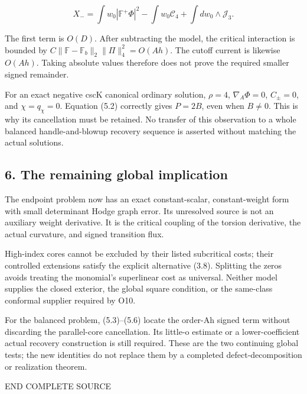 \documentclass[
  10pt,
]{article}
\begin{document}
\[
 X_-=\int w_0|\mathbb F^+\Phi|^2-
           \int w_0\mathcal C_4+\int dw_0\wedge\mathcal J_3.
 \tag{5.6}
\]

The first term is \(O(D)\). After subtracting the model, the critical
interaction is bounded by
\(C\|\mathbb F-\mathbb F_b\|_2\|\Pi\|_4^2=O(Ah)\). The cutoff current is
likewise \(O(Ah)\). Taking absolute values therefore does not prove the
required smaller signed remainder.

For an exact negative cscK canonical ordinary solution, \(\rho=4\),
\(\nabla_A\Phi=0\), \(C_\pm=0\), and \(\chi=q_\chi=0\). Equation (5.2)
correctly gives \(P=2B\), even when \(B\ne0\). This is why its
cancellation must be retained. No transfer of this observation to a
whole balanced handle-and-blowup recovery sequence is asserted without
matching the actual solutions.

\hypertarget{the-remaining-global-implication}{%
\subsection{6. The remaining global
implication}\label{the-remaining-global-implication}}

The endpoint problem now has an exact constant-scalar, constant-weight
form with small determinant Hodge graph error. Its unresolved source is
not an auxiliary weight derivative. It is the critical coupling of the
torsion derivative, the actual curvature, and signed transition flux.

High-index cores cannot be excluded by their listed subcritical costs;
their controlled extensions satisfy the explicit alternative (3.8).
Splitting the zeros avoids treating the monomial's superlinear cost as
universal. Neither model supplies the closed exterior, the global square
condition, or the same-class conformal supplier required by O10.

For the balanced problem, (5.3)--(5.6) locate the order-Ah signed term
without discarding the parallel-core cancellation. Its little-o estimate
or a lower-coefficient actual recovery construction is still required.
These are the two continuing global tests; the new identities do not
replace them by a completed defect-decomposition or realization theorem.

END COMPLETE SOURCE
\end{document}
